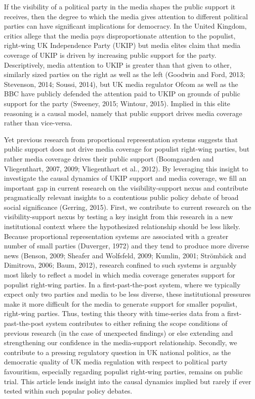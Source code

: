 \documentclass[12pt,article]{article}
\begin{document}
If the visibility of a political party in the media shapes the public
support it receives, then the degree to which the media gives attention
to different political parties can have significant implications for
democracy. In the United Kingdom, critics allege that the media pays
disproportionate attention to the populist, right-wing UK Independence
Party (UKIP) but media elites claim that media coverage of UKIP is
driven by increasing public support for the party. Descriptively, media
attention to UKIP is greater than that given to other, similarly sized
parties on the right as well as the left (Goodwin and Ford, 2013;
Stevenson, 2014; Soussi, 2014), but UK media regulator Ofcom as well as
the BBC have publicly defended the attention paid to UKIP on grounds of
public support for the party (Sweeney, 2015; Wintour, 2015). Implied in
this elite reasoning is a causal model, namely that public support
drives media coverage rather than vice-versa.

Yet previous research from proportional representation systems suggests
that public support does not drive media coverage for populist
right-wing parties, but rather media coverage drives their public
support (Boomgaarden and Vliegenthart, 2007, 2009; Vliegenthart et al.,
2012). By leveraging this insight to investigate the causal dynamics of
UKIP support and media coverage, we fill an important gap in current
research on the visibility-support nexus and contribute pragmatically
relevant insights to a contentious public policy debate of broad social
significance (Gerring, 2015). First, we contribute to current research
on the visibility-support nexus by testing a key insight from this
research in a new institutional context where the hypothesized
relationship should be less likely. Because proportional representation
systems are associated with a greater number of small parties (Duverger,
1972) and they tend to produce more diverse news (Benson, 2009; Sheafer
and Wolfsfeld, 2009; Kumlin, 2001; Strömbäck and Dimitrova, 2006; Baum,
2012), research confined to such systems is arguably most likely to
reflect a model in which media coverage generates support for populist
right-wing parties. In a first-past-the-post system, where we typically
expect only two parties and media to be less diverse, these
institutional pressures make it more difficult for the media to generate
support for smaller populist, right-wing parties. Thus, testing this
theory with time-series data from a first-past-the-post system
contributes to either refining the scope conditions of previous research
(in the case of unexpected findings) or else extending and strengthening
our confidence in the media-support relationship. Secondly, we
contribute to a pressing regulatory question in UK national politics, as
the democratic quality of UK media regulation with respect to political
party favouritism, especially regarding populist right-wing parties,
remains on public trial. This article lends insight into the causal
dynamics implied but rarely if ever tested within such popular policy
debates.
\end{document}
